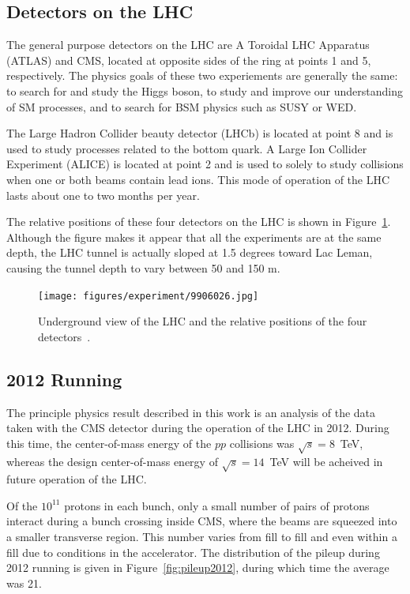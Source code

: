 \subsection{Detectors on the LHC\label{subsec:detectors}}

The general purpose detectors on the LHC are A Toroidal LHC Apparatus (ATLAS) and CMS, located at opposite sides of the ring at points 1 and 5, respectively. The physics
goals of these two experiements are generally the same: to search for and study the Higgs boson,
to study and improve our understanding of SM processes, and to search for BSM physics such as
SUSY or WED.

The Large Hadron Collider beauty detector (LHCb) is located at point 8 and is used
to study processes related to the bottom quark. A Large Ion Collider Experiment (ALICE) is located
at point 2 and is used to solely to study collisions when one or both beams contain lead ions. This
mode of operation of the LHC lasts about one to two months per year.

The relative positions of these four detectors on the LHC is shown in Figure~\ref{fig:lhc_detectors}.
Although the figure makes it appear that all the experiments are at the same depth, the LHC tunnel is
actually sloped at 1.5 degrees toward Lac Leman, causing the tunnel depth to vary between 50 and 150 m.

\begin{figure}[ht]
 \begin{center}
    \texttt{[image: figures/experiment/9906026.jpg]}
      \end{center}
\caption{Underground view of the LHC and the relative positions of the four detectors~\cite{Dailler:842399}.}
\label{fig:lhc_detectors}
\end{figure}

\subsection{2012 Running}

The principle physics result described in this work is an analysis of the data taken with the
CMS detector during the operation of the LHC in 2012. During this time, the center-of-mass energy
of the $pp$ collisions was $\sqrt{s} = 8$~TeV, whereas the design center-of-mass energy of
$\sqrt{s} = 14$~TeV will be acheived in future operation of the LHC. 

Of the $10^{11}$ protons in each bunch, only a small number of pairs of protons interact during
a bunch crossing inside CMS, where the beams are squeezed into a smaller transverse region. This number
varies from fill to fill and even within a fill due to conditions in the accelerator. The distribution
of the pileup during 2012 running is given in Figure~\ref{fig:pileup2012}, during which time the
average was 21.


